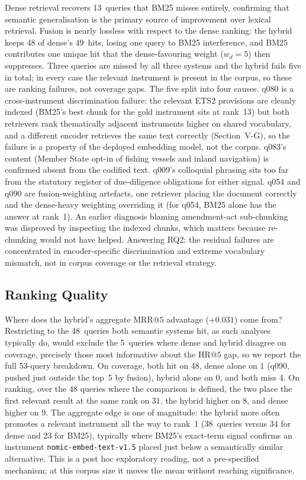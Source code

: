 \documentclass[conference,a4paper]{IEEEtran}
\makeatletter
\newcommand{\nomic}{\texttt{nomic-embed-text-v1.5}\xspace}
\newcommand{\HR}[1]{\mathrm{HR}@{#1}}
\newcommand{\MRR}[1]{\mathrm{MRR}@{#1}}
\makeatother
\begin{document}
Dense retrieval recovers 13~queries that BM25 misses entirely,
confirming that semantic generalisation is the primary source of
improvement over lexical retrieval.
Fusion is nearly lossless with respect to the dense ranking: the
hybrid keeps 48 of dense's 49~hits, losing one query to BM25
interference, and BM25 contributes one unique hit that the
dense-favouring weight ($w_d{=}5$) then suppresses.
Three queries are missed by all three systems and the hybrid fails
five in total; in every case the relevant instrument is present in
the corpus, so these are ranking failures, not coverage gaps.
The five split into four causes.
q080 is a cross-instrument discrimination failure: the relevant ETS2
provisions are cleanly indexed (BM25's best chunk for the gold
instrument sits at rank~13) but both retrievers rank thematically
adjacent instruments higher on shared vocabulary, and a different
encoder retrieves the same text correctly (Section~V-G), so the
failure is a property of the deployed embedding model, not the
corpus.
q083's content (Member State opt-in of fishing vessels and inland
navigation) is confirmed absent from the codified text.
q009's colloquial phrasing sits too far from the statutory register
of due-diligence obligations for either signal.
q054 and q090 are fusion-weighting artefacts, one retriever placing
the document correctly and the dense-heavy weighting overriding it
(for q054, BM25 alone has the answer at rank~1).
An earlier diagnosis blaming amendment-act sub-chunking was disproved
by inspecting the indexed chunks, which matters because re-chunking
would not have helped.
Answering RQ2: the residual failures are concentrated in
encoder-specific discrimination and extreme vocabulary mismatch, not
in corpus coverage or the retrieval strategy.

\subsection{Ranking Quality}

Where does the hybrid's aggregate $\MRR{5}$ advantage ($+0.031$) come
from?
Restricting to the 48~queries both semantic systems hit, as such
analyses typically do, would exclude the 5~queries where dense and
hybrid disagree on coverage, precisely those most informative about
the $\HR{5}$ gap, so we report the full 53-query breakdown.
On coverage, both hit on 48, dense alone on 1 (q090, pushed just
outside the top~5 by fusion), hybrid alone on 0, and both miss 4.
On ranking, over the 48 queries where the comparison is defined, the
two place the first relevant result at the same rank on 31, the
hybrid higher on 8, and dense higher on 9.
The aggregate edge is one of magnitude: the hybrid more often
promotes a relevant instrument all the way to rank~1 (38~queries
versus 34 for dense and 23 for BM25), typically where BM25's
exact-term signal confirms an instrument \nomic placed just below a
semantically similar alternative.
This is a post hoc exploratory reading, not a pre-specified
mechanism; at this corpus size it moves the mean without reaching
significance.
\end{document}
